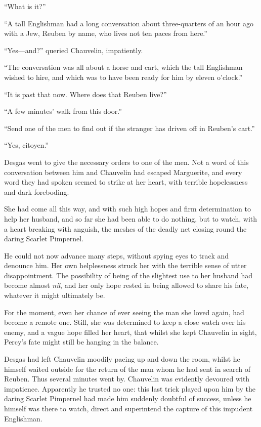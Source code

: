\enquote{What is it?}

\enquote{A tall Englishman had a long conversation about three-quarters of an hour ago with a Jew, Reuben by name, who lives not ten paces from here.}

\enquote{Yes---and?} queried Chauvelin, impatiently.

\enquote{The conversation was all about a horse and cart, which the tall Englishman wished to hire, and which was to have been ready for him by eleven o'clock.}

\enquote{It is past that now. Where does that Reuben live?}

\enquote{A few minutes’ walk from this door.}

\enquote{Send one of the men to find out if the stranger has driven off in Reuben's cart.}

\enquote{Yes, citoyen.}

Desgas went to give the necessary orders to one of the men. Not a word of this conversation between him and Chauvelin had escaped Marguerite, and every word they had spoken seemed to strike at her heart, with terrible hopelessness and dark foreboding.

She had come all this way, and with such high hopes and firm determination to help her husband, and so far she had been able to do nothing, but to watch, with a heart breaking with anguish, the meshes of the deadly net closing round the daring Scarlet Pimpernel.

He could not now advance many steps, without spying eyes to track and denounce him. Her own helplessness struck her with the terrible sense of utter disappointment. The possibility of being of the slightest use to her husband had become almost \textit{nil}, and her only hope rested in being allowed to share his fate, whatever it might ultimately be.

For the moment, even her chance of ever seeing the man she loved again, had become a remote one. Still, she was determined to keep a close watch over his enemy, and a vague hope filled her heart, that whilst she kept Chauvelin in sight, Percy's fate might still be hanging in the balance.

Desgas had left Chauvelin moodily pacing up and down the room, whilst he himself waited outside for the return of the man whom he had sent in search of Reuben. Thus several minutes went by. Chauvelin was evidently devoured with impatience. Apparently he trusted no one: this last trick played upon him by the daring Scarlet Pimpernel had made him suddenly doubtful of success, unless he himself was there to watch, direct and superintend the capture of this impudent Englishman.

